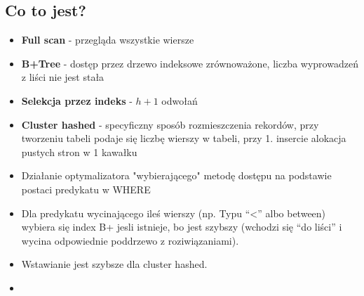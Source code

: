 \documentclass[a4paper,twoside]{article}
\begin{document}
  	\subsection*{Co to jest?}
  	\begin{itemize}
  		\item \textbf{Full scan} - przegląda wszystkie wiersze
  		\item \textbf{B+Tree} - dostęp przez drzewo indeksowe zrównoważone, liczba wyprowadzeń z liści nie jest stała
  		\item \textbf{Selekcja przez indeks} - ${h+1}$ odwołań
  		\item \textbf{Cluster hashed} - specyficzny sposób rozmieszczenia rekordów, przy tworzeniu tabeli podaje się liczbę wierszy w tabeli, przy 1.  insercie alokacja pustych stron w 1 kawałku
  	\end{itemize}
  	\begin{itemize}
  		\item Działanie optymalizatora "wybierającego" metodę dostępu na podstawie postaci predykatu w WHERE
  		\item Dla predykatu wycinającego ileś wierszy (np. Typu “<” albo between) wybiera się index B+ jesli istnieje, bo jest szybszy (wchodzi się “do liści” i wycina odpowiednie poddrzewo z roziwiązaniami).
  		\item Wstawianie jest szybsze dla cluster hashed.
  		\item 
  	\end{itemize}
  	
  	
  
\end{document}
